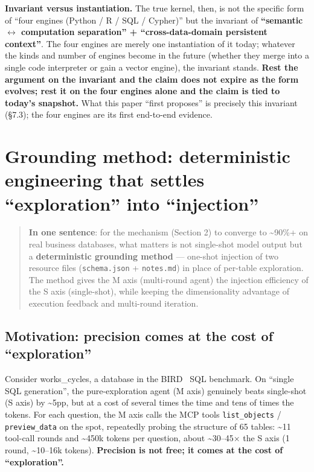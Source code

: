 \documentclass[11pt]{article}
\begin{document}
\textbf{Invariant versus instantiation.} The true kernel, then, is not the specific form of ``four engines (Python / R / SQL / Cypher)'' but the invariant of \textbf{``semantic $\leftrightarrow$ computation separation'' + ``cross-data-domain persistent context''}. The four engines are merely one instantiation of it today; whatever the kinds and number of engines become in the future (whether they merge into a single code interpreter or gain a vector engine), the invariant stands. \textbf{Rest the argument on the invariant and the claim does not expire as the form evolves; rest it on the four engines alone and the claim is tied to today's snapshot.} What this paper ``first proposes'' is precisely this invariant (\S{}7.3); the four engines are its first end-to-end evidence.

\section{Grounding method: deterministic engineering that settles ``exploration'' into ``injection''}

\begin{quote}
\textbf{In one sentence}: for the mechanism (Section 2) to converge to \textasciitilde90\%+ on real business databases, what matters is not single-shot model output but a \textbf{deterministic grounding method} --- one-shot injection of two resource files (\texttt{schema.json} + \texttt{notes.md}) in place of per-table exploration. The method gives the M axis (multi-round agent) the injection efficiency of the S axis (single-shot), while keeping the dimensionality advantage of execution feedback and multi-round iteration.
\end{quote}

\subsection{Motivation: precision comes at the cost of ``exploration''}

Consider works\_cycles, a database in the BIRD~\cite{bird} SQL benchmark. On ``single SQL generation'', the pure-exploration agent (M axis) genuinely beats single-shot (S axis) by \textasciitilde5pp, but at a cost of several times the time and tens of times the tokens. For each question, the M axis calls the MCP tools \texttt{list\_objects} / \texttt{preview\_data} on the spot, repeatedly probing the structure of 65 tables: \textasciitilde11 tool-call rounds and \textasciitilde450k tokens per question, about \textasciitilde30--45$\times$ the S axis (1 round, \textasciitilde10--16k tokens). \textbf{Precision is not free; it comes at the cost of ``exploration''.}
\end{document}
